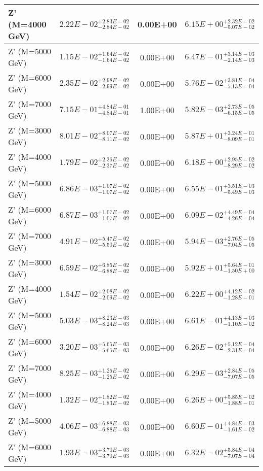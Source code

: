 \documentclass{article}
\begin{document}
\begin{center}
\begin{tabular}{ |l|c|c|c| }
 \hline
 Z' (M=4000 GeV) & $2.22E-02^{+2.83E-02}_{-2.84E-02}$ & 0.00E+00 & $6.15E+00^{+2.32E-02}_{-5.07E-02}$ \\
 \hline
 Z' (M=5000 GeV) & $1.15E-02^{+1.64E-02}_{-1.64E-02}$ & 0.00E+00 & $6.47E-01^{+3.14E-03}_{-2.14E-03}$ \\
 \hline
 Z' (M=6000 GeV) & $2.35E-02^{+2.98E-02}_{-2.99E-02}$ & 0.00E+00 & $5.76E-02^{+3.81E-04}_{-5.13E-04}$ \\
 \hline
 Z' (M=7000 GeV) & $7.15E-01^{+4.84E-01}_{-4.84E-01}$ & 1.00E+00 & $5.82E-03^{+2.73E-05}_{-6.15E-05}$ \\
 \hline
 Z' (M=3000 GeV) & $8.01E-02^{+8.07E-02}_{-8.11E-02}$ & 0.00E+00 & $5.87E+01^{+3.24E-01}_{-8.09E-01}$ \\
 \hline
 Z' (M=4000 GeV) & $1.79E-02^{+2.36E-02}_{-2.37E-02}$ & 0.00E+00 & $6.18E+00^{+2.95E-02}_{-8.29E-02}$ \\
 \hline
 Z' (M=5000 GeV) & $6.86E-03^{+1.07E-02}_{-1.07E-02}$ & 0.00E+00 & $6.55E-01^{+3.51E-03}_{-5.49E-03}$ \\
 \hline
 Z' (M=6000 GeV) & $6.87E-03^{+1.07E-02}_{-1.07E-02}$ & 0.00E+00 & $6.09E-02^{+4.49E-04}_{-4.26E-04}$ \\
 \hline
 Z' (M=7000 GeV) & $4.91E-02^{+5.47E-02}_{-5.50E-02}$ & 0.00E+00 & $5.94E-03^{+2.76E-05}_{-7.04E-05}$ \\
 \hline
 Z' (M=3000 GeV) & $6.59E-02^{+6.85E-02}_{-6.88E-02}$ & 0.00E+00 & $5.92E+01^{+5.64E-01}_{-1.50E+00}$ \\
 \hline
 Z' (M=4000 GeV) & $1.54E-02^{+2.08E-02}_{-2.09E-02}$ & 0.00E+00 & $6.22E+00^{+4.12E-02}_{-1.28E-01}$ \\
 \hline
 Z' (M=5000 GeV) & $5.03E-03^{+8.23E-03}_{-8.24E-03}$ & 0.00E+00 & $6.61E-01^{+4.13E-03}_{-1.10E-02}$ \\
 \hline
 Z' (M=6000 GeV) & $3.20E-03^{+5.65E-03}_{-5.65E-03}$ & 0.00E+00 & $6.26E-02^{+5.12E-04}_{-2.31E-04}$ \\
 \hline
 Z' (M=7000 GeV) & $8.25E-03^{+1.25E-02}_{-1.25E-02}$ & 0.00E+00 & $6.29E-03^{+2.84E-05}_{-7.07E-05}$ \\
 \hline
 Z' (M=4000 GeV) & $1.32E-02^{+1.82E-02}_{-1.83E-02}$ & 0.00E+00 & $6.26E+00^{+5.85E-02}_{-1.88E-01}$ \\
 \hline
 Z' (M=5000 GeV) & $4.06E-03^{+6.88E-03}_{-6.88E-03}$ & 0.00E+00 & $6.60E-01^{+4.84E-03}_{-1.61E-02}$ \\
 \hline
 Z' (M=6000 GeV) & $1.93E-03^{+3.70E-03}_{-3.70E-03}$ & 0.00E+00 & $6.32E-02^{+5.84E-04}_{-7.07E-04}$ \\

\end{tabular}
\end{center}
\end{document}
